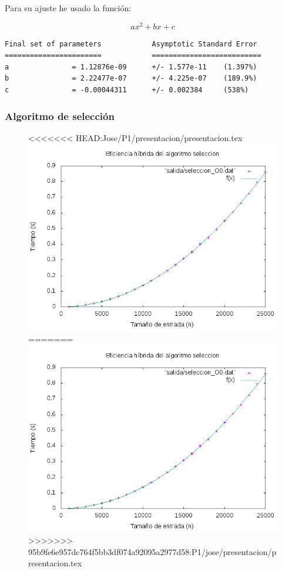 \documentclass[spanish]{beamer}
\begin{document}
\begin{frame}[fragile]
  Para su ajuste he usado la función:

  $$ax^2+bx+c$$
  
\scriptsize
\begin{verbatim}
Final set of parameters            Asymptotic Standard Error
=======================            ==========================
a               = 1.12876e-09      +/- 1.577e-11    (1.397%)
b               = 2.22477e-07      +/- 4.225e-07    (189.9%)
c               = -0.00044311      +/- 0.002384     (538%)
\end{verbatim}

\end{frame}


%
%

\begin{frame}\frametitle{Algoritmo de selección}
  \begin{figure}[H]
    \centering   
<<<<<<< HEAD:Jose/P1/presentacion/presentacion.tex
        \includegraphics[clip,width=1\columnwidth]{../plots/seleccion_O0_fit.png}%
=======
        \includegraphics[clip,width=0.8\columnwidth]{../plots/seleccion_O0_fit.png}%
>>>>>>> 95b9fe6e957dc764f5bb3df074a92095a2977d58:P1/jose/presentacion/presentacion.tex
    \end{figure}
  \end{frame}
\end{document}
